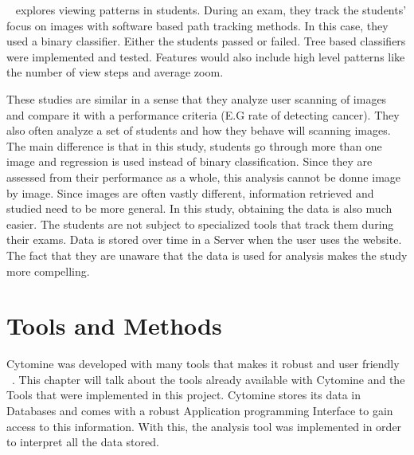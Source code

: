\documentclass[a4paper,11pt]{report}
\numberwithin{figure}{chapter} %
\begin{document}
~\cite{pathexams} explores viewing patterns in students.
During an exam, they track the students' focus on images with software based  path tracking methods.
In this case, they used a binary classifier.
Either the students passed or failed.
Tree based classifiers were implemented and tested.
Features would also include high level patterns like the number of view steps and average zoom.

These studies are similar in a sense that they analyze user scanning of images and compare it with a performance criteria (E.G rate of detecting cancer).
They also often analyze a set of students and how they behave will scanning images.
The main difference is that in this study, students go through more than one image and regression is used instead of binary classification.
Since they are assessed from their performance as a whole, this analysis cannot be donne image by image.
Since images are often vastly different, information retrieved and studied need to be more general.
In this study, obtaining the data is also much easier.
The students are not subject to specialized tools that track them during their exams.
Data is stored over time in a Server when the user uses the website.
The fact that they are unaware that the data is used for analysis makes the study more compelling.


\chapter{Tools and Methods} \label{chapt:tools}

    Cytomine was developed with many tools that makes it robust and user friendly ~\cite{cyt}.
    This chapter will talk about the tools already available with Cytomine and the Tools that were implemented in this project.
    Cytomine stores its data in Databases and comes with a robust Application programming Interface to gain access to this information.
    With this, the analysis tool was implemented in order to interpret all the data stored.
\end{document}
